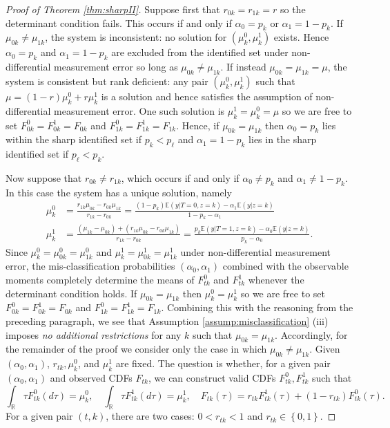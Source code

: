 \begin{proof}[Proof of Theorem \ref{thm:sharpII}]
Suppose first that $r_{0k} = r_{1k} = r$ so the determinant condition fails.
This occurs if and only if $\alpha_0 = p_k$ or $\alpha_1 = 1 - p_k$.
If $\mu_{0k} \neq \mu_{1k}$, the system is inconsistent: no solution for $(\mu_k^0, \mu_k^1)$ exists.
Hence $\alpha_0 = p_k$ and $\alpha_1 = 1 - p_k$ are excluded from the identified set under non-differential measurement error so long as $\mu_{0k} \neq \mu_{1k}$.
If instead $\mu_{0k} = \mu_{1k} = \mu$, the system is consistent but rank deficient: any pair $(\mu_k^0, \mu_k^1)$ such that $\mu = (1 - r) \mu_{k}^0 + r \mu_{k}^1$ is a solution and hence satisfies the assumption of non-differential measurement error.
One such solution is $\mu_{k}^1 = \mu_{k}^0 = \mu$ so we are free to set $F_{0k}^0 = F_{0k}^1 = F_{0k}$ and $F_{1k}^0 = F_{1k}^{1} = F_{1k}$.
Hence, if $\mu_{0k} = \mu_{1k}$ then $\alpha_0 = p_k$ lies within the sharp identified set if $p_k < p_\ell$ and $\alpha_1 = 1 - p_k$ lies in the sharp identified set if $p_\ell < p_k$.

Now suppose that $r_{0k} \neq r_{1k}$, which occurs if and only if $\alpha_0 \neq p_k$ and $\alpha_1 \neq 1 - p_k$.
In this case the system has a unique solution, namely
\begin{align*}
  \mu_k^0 &= \frac{r_{1k}\mu_{0k} - r_{0k}\mu_{1k}}{r_{1k} - r_{0k}} = \frac{(1 - p_k) \mathbb{E}(y|T=0,z=k) - \alpha_1 \mathbb{E}(y|z=k)}{1 - p_k - \alpha_1} \\ 
  \mu_k^1 &= \frac{(\mu_{1k} - \mu_{0k}) + (r_{1k}\mu_{0k} - r_{0k}\mu_{1k})}{r_{1k} - r_{0k}} = \frac{p_k \mathbb{E}(y|T=1,z=k) - \alpha_0 \mathbb{E}(y|z=k)}{p_k - \alpha_0}.
\end{align*}
Since $\mu_{k}^0 = \mu_{0k}^0 = \mu_{1k}^0$ and $\mu_{k}^1 = \mu_{0k}^1 = \mu_{1k}^1$ under non-differential measurement error, the mis-classification probabilities $(\alpha_0, \alpha_1)$ combined with the observable moments completely determine the means of $F_{tk}^0$ and $F_{tk}^1$ whenever the determinant condition holds.  
If $\mu_{0k} = \mu_{1k}$ then $\mu_{k}^0 = \mu_k^1$ so we are free to set $F_{0k}^0 = F_{0k}^1 = F_{0k}$ and $F_{1k}^0 = F_{1k}^1 = F_{1k}$.
Combining this with the reasoning from the preceding paragraph, we see that Assumption \ref{assump:misclassification} (iii) imposes \emph{no additional restrictions} for any $k$ such that $\mu_{0k} = \mu_{1k}$.
Accordingly, for the remainder of the proof we consider only the case in which $\mu_{0k} \neq \mu_{1k}$.
Given $(\alpha_0, \alpha_1)$, $r_{tk}, \mu^0_k$, and $\mu^1_{k}$ are fixed.
The question is whether, for a given pair $(\alpha_0, \alpha_1)$ and observed CDFs $F_{tk}$, we can construct valid CDFs $F_{tk}^0, F_{tk}^1$ such that 
\[
  \int_{\mathbb{R}} \tau F_{tk}^0(d\tau) = \mu_k^0, \quad
  \int_{\mathbb{R}} \tau F_{tk}^1(d\tau) = \mu_k^1, \quad 
  F_{tk}(\tau) = r_{tk} F^1_{tk}(\tau) + (1 - r_{tk}) F^0_{tk}(\tau).
\]
For a given pair $(t,k)$, there are two cases: $0 < r_{tk} < 1$ and $r_{tk} \in \left\{ 0, 1 \right\}$.


\end{proof}
